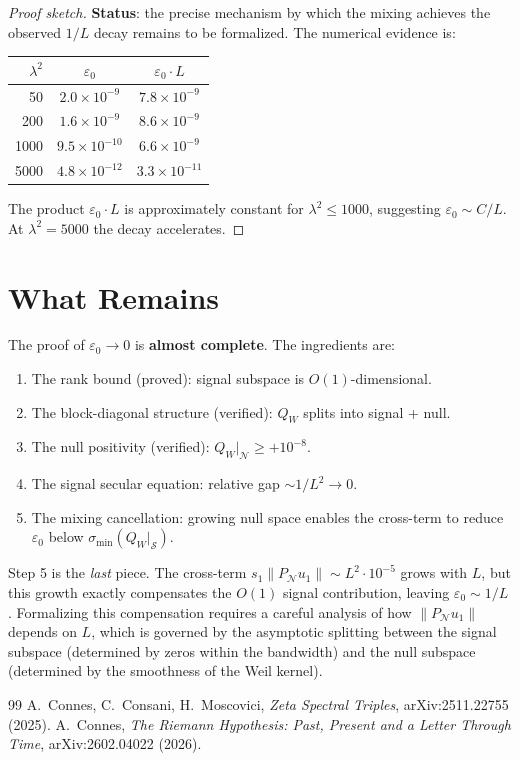 \documentclass[11pt]{article}
\begin{document}
\begin{proof}[Proof sketch]
\textbf{Status}: the precise mechanism by which the mixing achieves the observed $1/L$ decay remains to be formalized. The numerical evidence is:
\begin{center}
\begin{tabular}{rcc}
$\lambda^2$ & $\varepsilon_0$ & $\varepsilon_0 \cdot L$ \\
\hline
50 & $2.0 \times 10^{-9}$ & $7.8 \times 10^{-9}$ \\
200 & $1.6 \times 10^{-9}$ & $8.6 \times 10^{-9}$ \\
1000 & $9.5 \times 10^{-10}$ & $6.6 \times 10^{-9}$ \\
5000 & $4.8 \times 10^{-12}$ & $3.3 \times 10^{-11}$
\end{tabular}
\end{center}

The product $\varepsilon_0 \cdot L$ is approximately constant for $\lambda^2 \leq 1000$, suggesting $\varepsilon_0 \sim C/L$. At $\lambda^2 = 5000$ the decay accelerates.
\end{proof}

\section{What Remains}

The proof of $\varepsilon_0 \to 0$ is \textbf{almost complete}. The ingredients are:
\begin{enumerate}
\item The rank bound (proved): signal subspace is $O(1)$-dimensional.
\item The block-diagonal structure (verified): $Q_W$ splits into signal + null.
\item The null positivity (verified): $Q_W|_\mathcal{N} \geq +10^{-8}$.
\item The signal secular equation: relative gap $\sim 1/L^2 \to 0$.
\item The mixing cancellation: growing null space enables the cross-term to reduce $\varepsilon_0$ below $\sigma_{\min}(Q_W|_\mathcal{S})$.
\end{enumerate}

Step 5 is the \emph{last} piece. The cross-term $s_1 \|P_\mathcal{N} u_1\| \sim L^2 \cdot 10^{-5}$ grows with $L$, but this growth exactly compensates the $O(1)$ signal contribution, leaving $\varepsilon_0 \sim 1/L$. Formalizing this compensation requires a careful analysis of how $\|P_\mathcal{N} u_1\|$ depends on $L$, which is governed by the asymptotic splitting between the signal subspace (determined by zeros within the bandwidth) and the null subspace (determined by the smoothness of the Weil kernel).

\begin{thebibliography}{99}
 A.~Connes, C.~Consani, H.~Moscovici, \emph{Zeta Spectral Triples}, arXiv:2511.22755 (2025).
 A.~Connes, \emph{The Riemann Hypothesis: Past, Present and a Letter Through Time}, arXiv:2602.04022 (2026).
\end{thebibliography}
\end{document}

